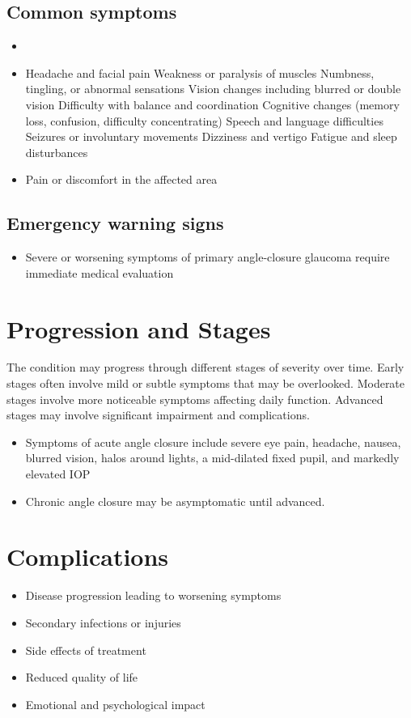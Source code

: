 \subsection{Common symptoms}
\begin{itemize}[noitemsep]
  \item \item Headache and facial pain Weakness or paralysis of muscles Numbness, tingling, or abnormal sensations Vision changes including blurred or double vision Difficulty with balance and coordination Cognitive changes (memory loss, confusion, difficulty concentrating) Speech and language difficulties Seizures or involuntary movements Dizziness and vertigo Fatigue and sleep disturbances
  \item Pain or discomfort in the affected area
  \end{itemize}
\subsection{Emergency warning signs}
\begin{itemize}[noitemsep]
  \item Severe or worsening symptoms of primary angle-closure glaucoma require immediate medical evaluation
\end{itemize}
\section{Progression and Stages}
The condition may progress through different stages of severity over time. Early stages often involve mild or subtle symptoms that may be overlooked. Moderate stages involve more noticeable symptoms affecting daily function. Advanced stages may involve significant impairment and complications.

\begin{itemize}[noitemsep]
  \item Symptoms of acute angle closure include severe eye pain, headache, nausea, blurred vision, halos around lights, a mid-dilated fixed pupil, and markedly elevated IOP
  \item Chronic angle closure may be asymptomatic until advanced.
\end{itemize}
\section{Complications}
\begin{itemize}[noitemsep]
  \item Disease progression leading to worsening symptoms
  \item Secondary infections or injuries
  \item Side effects of treatment
  \item Reduced quality of life
  \item Emotional and psychological impact
\end{itemize}

